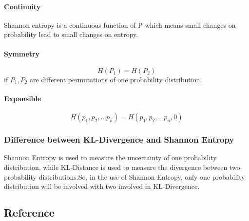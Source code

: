 \documentclass[
]{article}
\begin{document}
\hypertarget{continuity}{%
\paragraph{Continuity}\label{continuity}}

Shannon entropy is a continuous function of P which means small changes
on probability lead to small changes on entropy.

\hypertarget{symmetry}{%
\paragraph{Symmetry}\label{symmetry}}

\[H(P_1)=H(P_2)\] if \(P_1,P_2\) are different permutations of one
probability distribution.

\hypertarget{expansible}{%
\paragraph{Expansible}\label{expansible}}

\[H(p_1,p_2,...p_n)=H(p_1,p_2,...p_n,0)\]

\hypertarget{difference-between-kl-divergence-and-shannon-entropy}{%
\subsubsection{Difference between KL-Divergence and Shannon
Entropy}\label{difference-between-kl-divergence-and-shannon-entropy}}

Shannon Entropy is used to measure the uncertainty of one probability
distribution, while KL-Distance is used to measure the divergence
between two probability distributions.So, in the use of Shannon Entropy,
only one probability distribution will be involved with two involved in
KL-Divergence.

\hypertarget{reference}{%
\subsection{Reference}\label{reference}}
\end{document}
